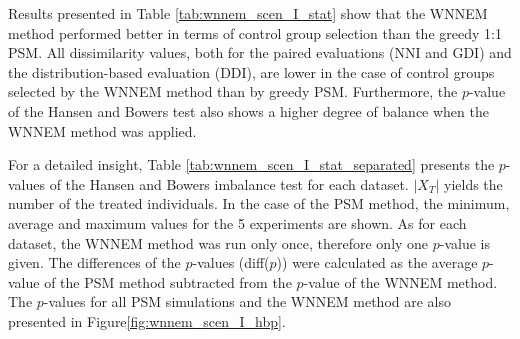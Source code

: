 		Results presented in Table \ref{tab:wnnem_scen_I_stat} show that the WNNEM method performed better in terms of control group selection than the greedy 1:1 PSM. All dissimilarity values, both for the paired evaluations (NNI and GDI) and the distribution-based evaluation (DDI), are lower in the case of control groups selected by the WNNEM method than by greedy PSM. Furthermore, the $p$-value of the Hansen and Bowers test also shows a higher degree of balance when the WNNEM method was applied. 
								
		For a detailed insight, Table \ref{tab:wnnem_scen_I_stat_separated} presents the $p$-values of the Hansen and Bowers imbalance test for each dataset. $|X_T|$ yields the number of the treated individuals. In the case of the PSM method, the minimum, average and maximum values for the 5 experiments are shown. As for each dataset, the WNNEM method was run only once, therefore only one $p$-value is given. The differences of the $p$-values (diff($p$)) were calculated as the average $p$-value of the PSM method subtracted from the $p$-value of the WNNEM method. 
		The $p$-values for all PSM simulations and the WNNEM method are also presented in Figure\ref{fig:wnnem_scen_I_hbp}.   
								
